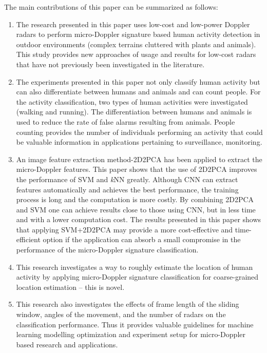 The main contributions of this paper can be summarized as follows:
\begin{enumerate}
\item The research presented in this paper uses low-cost and low-power Doppler radars to perform micro-Doppler signature based human activity detection in outdoor environments (complex terrains cluttered with plants and animals). This study provides new approaches of usage and results for low-cost radars that have not previously been investigated in the literature.
\item The experiments presented in this paper not only classify human activity but can also differentiate between humans and animals and can count people. For the activity classification, two types of human activities were investigated (walking and running). The differentiation between humans and animals is used to reduce the rate of false alarms resulting from animals. People counting provides the number of individuals performing an activity that could be valuable information in applications pertaining to surveillance, monitoring.
\item An image feature extraction method-2D2PCA has been applied to extract the micro-Doppler features. This paper shows that the use of 2D2PCA improves the performance of SVM and \textit{k}NN greatly. Although CNN can extract features automatically and achieves the best performance, the training process is long and the computation is more costly. By combining 2D2PCA and SVM one can achieve results close to those using CNN, but in less time and with a lower computation cost. The results presented in this paper shows that applying SVM+2D2PCA may provide a more cost-effective and time-efficient option if the application can absorb a small compromise in the performance of the micro-Doppler signature classification.
\item This research investigates a way to roughly estimate the location of human activity by applying micro-Doppler signature classification for coarse-grained location estimation -- this is novel.
\item This research also investigates the effects of frame length of the sliding window, angles of the movement, and the number of radars on the classification performance. Thus it provides valuable guidelines for machine learning modelling optimization and experiment setup for micro-Doppler based research and applications.
\end{enumerate}

